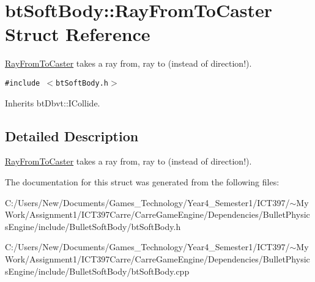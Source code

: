 \hypertarget{structbt_soft_body_1_1_ray_from_to_caster}{
\section{btSoftBody::RayFromToCaster Struct Reference}
\label{structbt_soft_body_1_1_ray_from_to_caster}
}
\hyperlink{structbt_soft_body_1_1_ray_from_to_caster}{RayFromToCaster} takes a ray from, ray to (instead of direction!).  


{\tt \#include $<$btSoftBody.h$>$}

Inherits btDbvt::ICollide.



\subsection{Detailed Description}
\hyperlink{structbt_soft_body_1_1_ray_from_to_caster}{RayFromToCaster} takes a ray from, ray to (instead of direction!). 

The documentation for this struct was generated from the following files:\begin{CompactItemize}
\item 
C:/Users/New/Documents/Games\_\-Technology/Year4\_\-Semester1/ICT397/$\sim$My Work/Assignment1/ICT397Carre/CarreGameEngine/Dependencies/BulletPhysicsEngine/include/BulletSoftBody/btSoftBody.h\item 
C:/Users/New/Documents/Games\_\-Technology/Year4\_\-Semester1/ICT397/$\sim$My Work/Assignment1/ICT397Carre/CarreGameEngine/Dependencies/BulletPhysicsEngine/include/BulletSoftBody/btSoftBody.cpp\end{CompactItemize}
